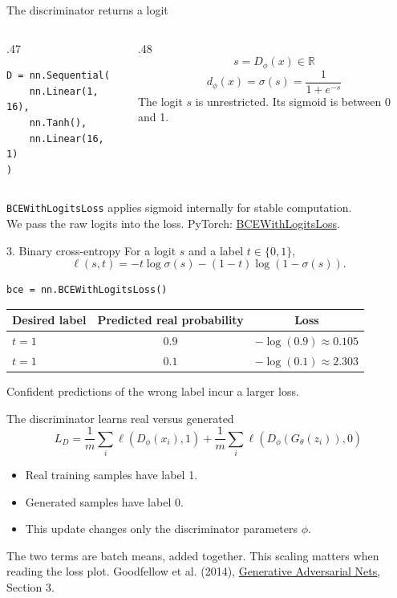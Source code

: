 \documentclass[aspectratio=169,11pt]{beamer}
\newcommand{\ganref}{\vfill{\tiny\color{gray}Goodfellow et al. (2014), \href{https://arxiv.org/abs/1406.2661}{Generative Adversarial Nets}, Section 3.}}
\begin{document}
\begin{frame}[fragile]{The discriminator returns a logit}
\begin{columns}[c]
\begin{column}{.47\textwidth}
\begin{lstlisting}
D = nn.Sequential(
    nn.Linear(1, 16),
    nn.Tanh(),
    nn.Linear(16, 1)
)
\end{lstlisting}
\end{column}
\begin{column}{.48\textwidth}
\[s=D_\phi(x)\in\mathbb R\]
\[d_\phi(x)=\sigma(s)=\frac{1}{1+e^{-s}}\]
\small
The logit $s$ is unrestricted. Its sigmoid is between 0 and 1.
\end{column}
\end{columns}
\vspace{5mm}
\texttt{BCEWithLogitsLoss} applies sigmoid internally for stable computation.\\[3mm]
We pass the raw logits into the loss.
\vfill{\tiny\color{gray}PyTorch: \href{https://docs.pytorch.org/docs/stable/generated/torch.nn.BCEWithLogitsLoss.html}{BCEWithLogitsLoss}.}
\end{frame}

\begin{frame}[fragile]{3. Binary cross-entropy}
For a logit $s$ and a label $t\in\{0,1\}$,
\[\ell(s,t)=-t\log\sigma(s)-(1-t)\log(1-\sigma(s)).\]
\begin{lstlisting}
bce = nn.BCEWithLogitsLoss()
\end{lstlisting}
\begin{center}
\begin{tabular}{lcc}
\toprule
Desired label & Predicted real probability & Loss\\\midrule
$t=1$ & $0.9$ & $-\log(0.9)\approx0.105$\\[2mm]
$t=1$ & $0.1$ & $-\log(0.1)\approx2.303$\\\bottomrule
\end{tabular}
\end{center}
\vspace{3mm}
Confident predictions of the wrong label incur a larger loss.
\end{frame}

\begin{frame}{The discriminator learns real versus generated}
\large
\[L_D=\frac1m\sum_i\ell(D_\phi(x_i),1)
+\frac1m\sum_i\ell(D_\phi(G_\theta(z_i)),0)\]
\normalsize
\begin{itemize}\setlength\itemsep{4mm}
\item Real training samples have label 1.
\item Generated samples have label 0.
\item This update changes only the discriminator parameters $\phi$.
\end{itemize}
\vspace{5mm}
The two terms are batch means, added together. This scaling matters when reading the loss plot.
\ganref
\end{frame}
\end{document}
